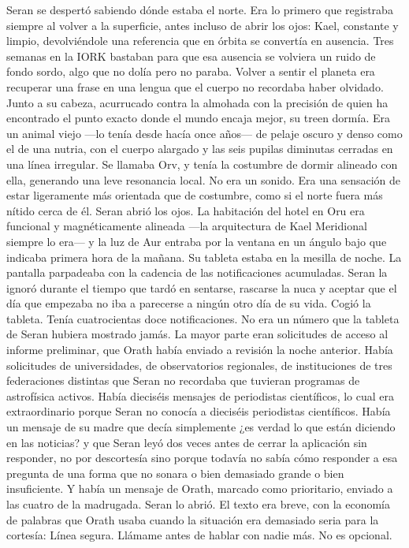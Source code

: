 \documentclass[11pt,a5paper,twoside]{book}
\begin{document}
Seran se despertó sabiendo dónde estaba el norte.
Era lo primero que registraba siempre al volver a la superficie, antes incluso de abrir los ojos: Kael, constante y limpio, devolviéndole una referencia que en órbita se convertía en ausencia. Tres semanas en la IORK bastaban para que esa ausencia se volviera un ruido de fondo sordo, algo que no dolía pero no paraba. Volver a sentir el planeta era recuperar una frase en una lengua que el cuerpo no recordaba haber olvidado.
Junto a su cabeza, acurrucado contra la almohada con la precisión de quien ha encontrado el punto exacto donde el mundo encaja mejor, su treen dormía. Era un animal viejo —lo tenía desde hacía once años— de pelaje oscuro y denso como el de una nutria, con el cuerpo alargado y las seis pupilas diminutas cerradas en una línea irregular. Se llamaba Orv, y tenía la costumbre de dormir alineado con ella, generando una leve resonancia local. No era un sonido. Era una sensación de estar ligeramente más orientada que de costumbre, como si el norte fuera más nítido cerca de él.
Seran abrió los ojos. La habitación del hotel en Oru era funcional y magnéticamente alineada —la arquitectura de Kael Meridional siempre lo era— y la luz de Aur entraba por la ventana en un ángulo bajo que indicaba primera hora de la mañana.
Su tableta estaba en la mesilla de noche. La pantalla parpadeaba con la cadencia de las notificaciones acumuladas.
Seran la ignoró durante el tiempo que tardó en sentarse, rascarse la nuca y aceptar que el día que empezaba no iba a parecerse a ningún otro día de su vida.
Cogió la tableta.
Tenía cuatrocientas doce notificaciones.
No era un número que la tableta de Seran hubiera mostrado jamás. La mayor parte eran solicitudes de acceso al informe preliminar, que Orath había enviado a revisión la noche anterior. Había solicitudes de universidades, de observatorios regionales, de instituciones de tres federaciones distintas que Seran no recordaba que tuvieran programas de astrofísica activos. Había dieciséis mensajes de periodistas científicos, lo cual era extraordinario porque Seran no conocía a dieciséis periodistas científicos. Había un mensaje de su madre que decía simplemente ¿es verdad lo que están diciendo en las noticias? y que Seran leyó dos veces antes de cerrar la aplicación sin responder, no por descortesía sino porque todavía no sabía cómo responder a esa pregunta de una forma que no sonara o bien demasiado grande o bien insuficiente.
Y había un mensaje de Orath, marcado como prioritario, enviado a las cuatro de la madrugada.
Seran lo abrió.
El texto era breve, con la economía de palabras que Orath usaba cuando la situación era demasiado seria para la cortesía: Línea segura. Llámame antes de hablar con nadie más. No es opcional.
\end{document}
